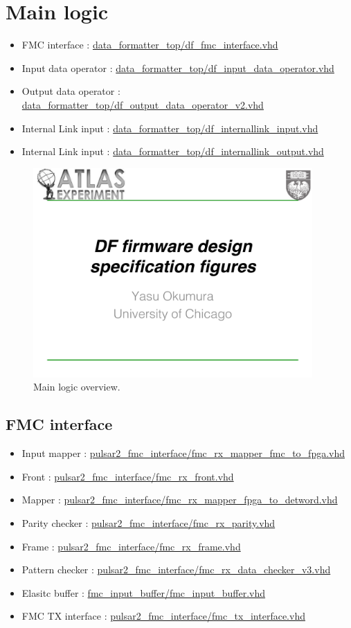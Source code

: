 \documentclass[11pt,letterpaper]{article}
\begin{document}
\section{Main logic}
\begin{itemize}
\item FMC interface : \url{data_formatter_top/df_fmc_interface.vhd}
\item Input data operator : \url{data_formatter_top/df_input_data_operator.vhd}
\item Output data operator : \url{data_formatter_top/df_output_data_operator_v2.vhd}
\item Internal Link input : \url{data_formatter_top/df_internallink_input.vhd}
\item Internal Link input : \url{data_formatter_top/df_internallink_output.vhd}
\end{itemize}

\begin{figure}[h!]
  \centering
  \includegraphics[width=0.95\textwidth,clip,page=4]{figures.pdf}
  \caption{Main logic overview.}
  \label{fig:MAIN_LOGIC_OVERVIEW}
\end{figure}

\subsection{FMC interface}
\begin{itemize}
\item Input mapper : \url{pulsar2_fmc_interface/fmc_rx_mapper_fmc_to_fpga.vhd}
\item Front : \url{pulsar2_fmc_interface/fmc_rx_front.vhd}
\item Mapper : \url{pulsar2_fmc_interface/fmc_rx_mapper_fpga_to_detword.vhd}
\item Parity checker : \url{pulsar2_fmc_interface/fmc_rx_parity.vhd}
\item Frame : \url{pulsar2_fmc_interface/fmc_rx_frame.vhd}
\item Pattern checker : \url{pulsar2_fmc_interface/fmc_rx_data_checker_v3.vhd}
\item Elasitc buffer : \url{fmc_input_buffer/fmc_input_buffer.vhd}
\item FMC TX interface : \url{pulsar2_fmc_interface/fmc_tx_interface.vhd}
\end{itemize}
\end{document}
